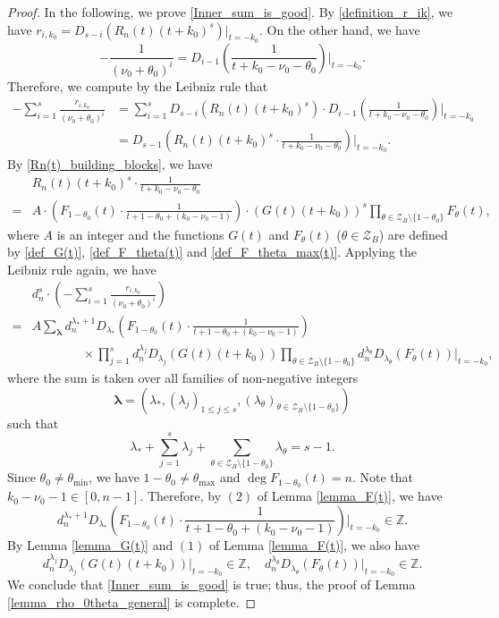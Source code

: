 \documentclass[12pt]{article}
\numberwithin{equation}{section}
\begin{document}
\begin{proof}
In the following, we prove \eqref{Inner_sum_is_good}. By \eqref{definition_r_ik}, we have $r_{i,k_0} = D_{s-i}(R_n(t)(t+k_0)^s)\big|_{t=-k_0}$. On the other hand, we have
\[ -\frac{1}{(\nu_0+\theta_0)^{i}} = D_{i-1}\left(  \frac{1}{t+k_0-\nu_0-\theta_0} \right)\Bigg|_{t=-k_0}. \]
Therefore, we compute by the Leibniz rule that
\begin{align*}
-\sum_{i=1}^{s}\frac{r_{i,k_0}}{(\nu_0+\theta_0)^{i}} &= \sum_{i=1}^{s} D_{s-i}(R_n(t)(t+k_0)^s)\cdot D_{i-1}\left(  \frac{1}{t+k_0-\nu_0-\theta_0} \right)\Bigg|_{t=-k_0} \\
&= D_{s-1}\left( R_n(t)(t+k_0)^s \cdot  \frac{1}{t+k_0-\nu_0-\theta_0} \right)\Bigg|_{t=-k_0}.
\end{align*}
By \eqref{Rn(t)_building_blocks}, we have
\begin{align*}
&R_n(t)(t+k_0)^s \cdot  \frac{1}{t+k_0-\nu_0-\theta_0} \\ 
=& A\cdot \left( F_{1-\theta_0}(t)\cdot\frac{1}{t+1-\theta_0+(k_0-\nu_0-1)} \right) \cdot \left(G(t)(t+k_0)\right)^s\prod_{\theta \in \mathcal{Z}_B \setminus\{1-\theta_0\}} F_{\theta}(t),
\end{align*}
where $A$ is an integer and the functions $G(t)$ and $F_{\theta}(t)$ ($\theta \in \mathcal{Z}_B$) are defined by \eqref{def_G(t)}, \eqref{def_F_theta(t)} and \eqref{def_F_theta_max(t)}. Applying the Leibniz rule again, we have
\begin{align*}
&d_n^{s} \cdot \left(-\sum_{i=1}^{s}\frac{r_{i,k_0}}{(\nu_0+\theta_0)^{i}} \right) \\
=& A \sum_{\boldsymbol{\lambda}} d_n^{\lambda_{*}+1}D_{\lambda_{*}}\left( F_{1-\theta_0}(t)\cdot\frac{1}{t+1-\theta_0+(k_0-\nu_0-1)} \right) \\ &\qquad\qquad\times\prod_{j=1}^{s}d_n^{\lambda_j}D_{\lambda_j}(G(t)(t+k_0))\prod_{\theta \in \mathcal{Z}_B\setminus\{1-\theta_0\}}d_n^{\lambda_\theta}D_{\lambda_\theta}(F_{\theta}(t))\big|_{t=-k_0},
\end{align*}
where the sum is taken over all families of non-negative integers 
\[\boldsymbol{\lambda} = (\lambda_*, (\lambda_{j})_{1 \leqslant j \leqslant s},(\lambda_{\theta})_{\theta \in \mathcal{Z}_B\setminus\{1-\theta_0\}})\]
such that
\[ \lambda_* + \sum_{j=1}^{s} \lambda_j + \sum_{\theta \in \mathcal{Z}_B\setminus\{1-\theta_0\}} \lambda_{\theta} = s-1. \]
Since $\theta_0 \neq \theta_{\min}$, we have $1- \theta_0 \neq \theta_{\max}$ and $\deg F_{1-\theta_0}(t) = n$. Note that $k_0-\nu_0-1 \in [0,n-1]$. Therefore, by $(2)$ of Lemma \ref{lemma_F(t)}, we have
\[ d_n^{\lambda_{*}+1}D_{\lambda_{*}}\left( F_{1-\theta_0}(t)\cdot\frac{1}{t+1-\theta_0+(k_0-\nu_0-1)} \right)\Bigg|_{t=-k_0} \in \mathbb{Z}. \]
By Lemma \ref{lemma_G(t)} and $(1)$ of Lemma \ref{lemma_F(t)}, we also have
\[ d_n^{\lambda_j}D_{\lambda_j}(G(t)(t+k_0))\big|_{t=-k_0} \in \mathbb{Z}, \quad d_n^{\lambda_\theta}D_{\lambda_\theta}(F_{\theta}(t))\big|_{t=-k_0} \in \mathbb{Z}. \]
We conclude that \eqref{Inner_sum_is_good} is true; thus, the proof of Lemma \ref{lemma_rho_0theta_general} is complete.
\end{proof}
\end{document}
